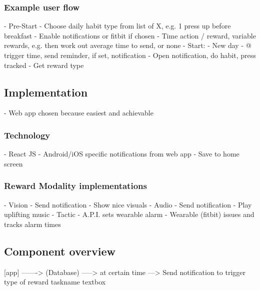   \subsubsection{Example user flow}
      - Pre-Start\newline
        - Choose daily habit type from list of X, e.g. 1 press up before breakfast\newline
        - Enable notifications or fitbit if chosen\newline
        - Time action / reward, variable rewards, e.g. then work out average time to send, or none\newline
      - Start:\newline
        - New day\newline
        - @ trigger time, send reminder, if set, notification\newline
        - Open notification, do habit, press tracked\newline
        - Get reward type
  \subsection{Implementation}
    - Web app chosen because easiest and achievable
  \subsubsection{Technology}
      - React JS\newline
      - Android/iOS specific notifications from web app\newline
      - Save to home screen
  \subsubsection{Reward Modality implementations}
      - Vision\newline
        - Send notification\newline
        - Show nice visuals\newline
      - Audio\newline
        - Send notification\newline
        - Play uplifting music\newline
      - Tactic\newline
        - A.P.I. sets wearable alarm\newline
        - Wearable (fitbit) issues and tracks alarm times
    \subsection{Component overview}
      [app] -------> (Database) -----> at certain time ---> Send notification to trigger type of reward\newline
      taskname textbox



